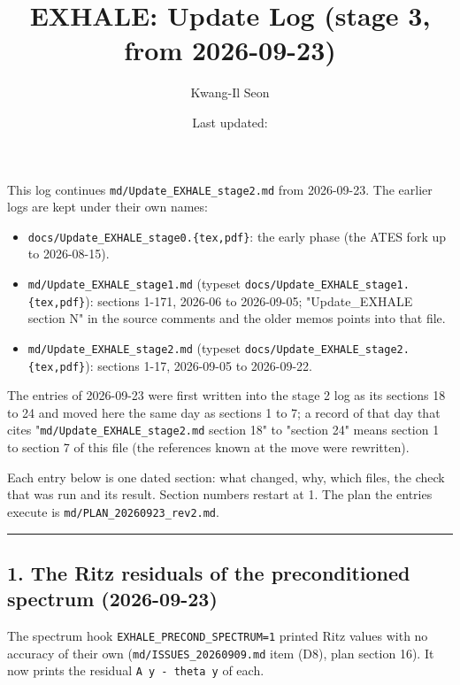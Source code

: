 \documentclass[english,a4paper]{my_memo}
\providecommand{\tightlist}{\setlength{\itemsep}{0pt}\setlength{\parskip}{0pt}}
\begin{document}
\title{EXHALE: Update Log (stage 3, from 2026-09-23)}
\author{Kwang-Il Seon}
\date{Last updated: \docmoddate}
\maketitle

\tableofcontents
\bigskip

This log continues \texttt{md/Update\_EXHALE\_stage2.md} from 2026-09-23. The
earlier logs are kept under their own names:

\begin{itemize}
\tightlist
\item
  \texttt{docs/Update\_EXHALE\_stage0.\{tex,pdf\}}: the early phase (the ATES fork up to
  2026-08-15).
\item
  \texttt{md/Update\_EXHALE\_stage1.md} (typeset \texttt{docs/Update\_EXHALE\_stage1.\{tex,pdf\}}):
  sections 1-171, 2026-06 to 2026-09-05; "Update\_EXHALE section N" in the
  source comments and the older memos points into that file.
\item
  \texttt{md/Update\_EXHALE\_stage2.md} (typeset \texttt{docs/Update\_EXHALE\_stage2.\{tex,pdf\}}):
  sections 1-17, 2026-09-05 to 2026-09-22.
\end{itemize}

The entries of 2026-09-23 were first written into the stage 2 log as its
sections 18 to 24 and moved here the same day as sections 1 to 7; a record of
that day that cites "\texttt{md/Update\_EXHALE\_stage2.md} section 18" to "section
24" means section 1 to section 7 of this file (the references known at the
move were rewritten).

Each entry below is one dated section: what changed, why, which files, the
check that was run and its result. Section numbers restart at 1. The plan the
entries execute is \texttt{md/PLAN\_20260923\_rev2.md}.

\begin{center}\rule{0.5\linewidth}{0.5pt}\end{center}

\subsection{1. The Ritz residuals of the preconditioned spectrum (2026-09-23)}\label{1-the-ritz-residuals-of-the-preconditioned-spectrum-2026-09-23}

The spectrum hook \texttt{EXHALE\_PRECOND\_SPECTRUM=1} printed Ritz values with no
accuracy of their own (\texttt{md/ISSUES\_20260909.md} item (D8), plan section 16).
It now prints the residual \texttt{\textbar{}\textbar{}A\ y\ -\ theta\ y\textbar{}\textbar{}} of each.
\end{document}
